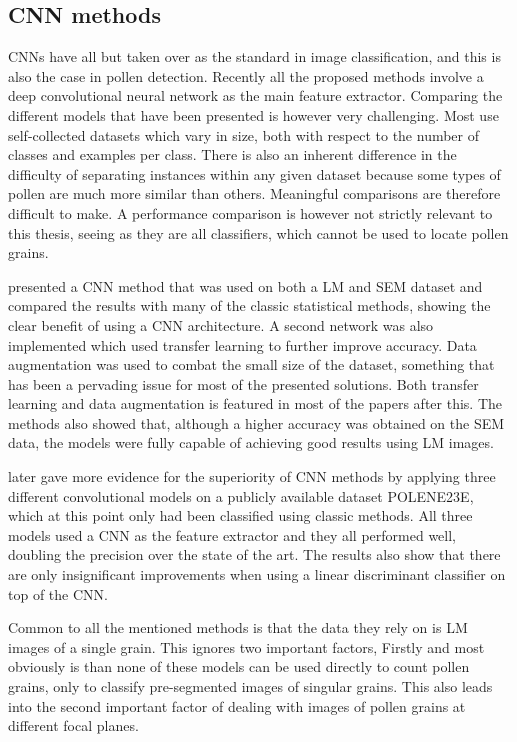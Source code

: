 \subsection{CNN methods}
CNNs have all but taken over as the standard in image classification, and this is also the case in pollen detection.
Recently all the proposed methods involve a deep convolutional neural network as the main feature extractor.
Comparing the different models that have been presented is however very challenging.
Most use self-collected datasets which vary in size, both with respect to the number of classes and examples per class.
There is also an inherent difference in the difficulty of separating instances within any given dataset because some types of pollen are much more similar than others.
Meaningful comparisons are therefore difficult to make.
A performance comparison is however not strictly relevant to this thesis, seeing as they are all classifiers, which cannot be used to locate pollen grains.

{\cite{daood_pollen_2016}} presented a CNN method that was used on both a LM and SEM dataset and compared the results with many of the classic statistical methods, showing the clear benefit of using a CNN architecture.
A second network was also implemented which used transfer learning to further improve accuracy.
Data augmentation was used to combat the small size of the dataset, something that has been a pervading issue for most of the presented solutions.
Both transfer learning and data augmentation is featured in most of the papers after this.
The methods also showed that, although a higher accuracy was obtained on the SEM data, the models were fully capable of achieving good results using LM images.

{\cite{sevillano_improving_2018}} later gave more evidence for the superiority of CNN methods by applying three different convolutional models on a publicly available dataset {POLENE23E}, which at this point only had been classified using classic methods.
All three models used a CNN as the feature extractor and they all performed well, doubling the precision over the state of the art.
The results also show that there are only insignificant improvements when using a linear discriminant classifier on top of the CNN\@.

Common to all the mentioned methods is that the data they rely on is LM images of a single grain.
This ignores two important factors, Firstly and most obviously is than none of these models can be used directly to count pollen grains, only to classify pre-segmented images of singular grains.
This also leads into the second important factor of dealing with images of pollen grains at different focal planes.

